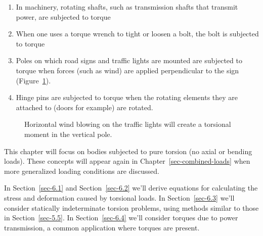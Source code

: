 \documentclass[
  letterpaper,
  DIV=11,
  numbers=noendperiod]{scrreprt}
\providecommand{\tightlist}{%
  \setlength{\itemsep}{0pt}\setlength{\parskip}{0pt}}\usepackage{longtable,booktabs,array}
\theoremstyle{definition}
\theoremstyle{remark}
\begin{document}
\begin{enumerate}
\def\labelenumi{\arabic{enumi}.}
\tightlist
\item
  In machinery, rotating shafts, such as transmission shafts that
  transmit power, are subjected to torque
\item
  When one uses a torque wrench to tight or loosen a bolt, the bolt is
  subjected to torque
\item
  Poles on which road signs and traffic lights are mounted are subjected
  to torque when forces (such as wind) are applied perpendicular to the
  sign (Figure~\ref{fig-6.1}).
\item
  Hinge pins are subjected to torque when the rotating elements they are
  attached to (doors for example) are rotated.
\end{enumerate}

\begin{figure}


\caption{\label{fig-6.1}Horizontal wind blowing on the traffic lights
will create a torsional moment in the vertical pole.}

\end{figure}%

This chapter will focus on bodies subjected to pure torsion (no axial or
bending loads). These concepts will appear again in
Chapter~\ref{sec-combined-loads} when more generalized loading
conditions are discussed.

In Section~\ref{sec-6.1} and Section~\ref{sec-6.2} we'll derive
equations for calculating the stress and deformation caused by torsional
loads. In Section~\ref{sec-6.3} we'll consider statically indeterminate
torsion problems, using methods similar to those in
Section~\ref{sec-5.5}. In Section~\ref{sec-6.4} we'll consider torques
due to power transmission, a common application where torques are
present.
\end{document}
